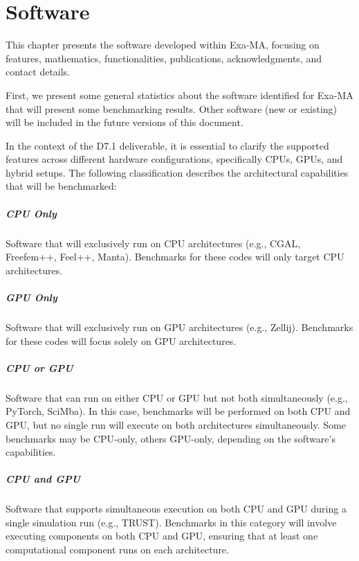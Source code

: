 \clearpage
\chapter{Software}
\label{chap:software}

This chapter presents the software developed within Exa-MA, focusing on features, mathematics, functionalities, publications, acknowledgments, and contact details.

First, we present some general statistics about the software identified for Exa-MA that will present some benchmarking results. 
Other software (new or existing) will be included in the future versions of this document.

In the context of the D7.1 deliverable, it is essential to clarify the supported features across different hardware configurations, specifically CPUs, GPUs, and hybrid setups. 
The following classification describes the architectural capabilities that will be benchmarked:

\paragraph{CPU Only}
Software that will exclusively run on CPU architectures (e.g., CGAL, Freefem++, Feel++, Manta). Benchmarks for these codes will only target CPU architectures.

\paragraph{GPU Only}
Software that will exclusively run on GPU architectures (e.g., Zellij). Benchmarks for these codes will focus solely on GPU architectures.

\paragraph{CPU or GPU}
Software that can run on either CPU or GPU but not both simultaneously (e.g., PyTorch, SciMba). In this case, benchmarks will be performed on both CPU and GPU, but no single run will execute on both architectures simultaneously. Some benchmarks may be CPU-only, others GPU-only, depending on the software's capabilities.

\paragraph{CPU and GPU}
Software that supports simultaneous execution on both CPU and GPU during a single simulation run (e.g., TRUST). Benchmarks in this category will involve executing components on both CPU and GPU, ensuring that at least one computational component runs on each architecture.

